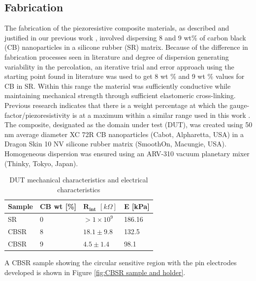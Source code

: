 \subsection{Fabrication} \label{sec:Fabrication}
The fabrication of the piezoresistive composite materials, as described and justified in our previous work \citep{Ellingham2021}, involved dispersing 8 and 9 wt\% of carbon black (CB) nanoparticles in a silicone rubber (SR) matrix. Because of the difference in fabrication processes seen in literature \cite{D'Asaro2017, Shang2016} and degree of dispersion generating variability in the percolation, an iterative trial and error approach using the starting point found in literature was used to get 8 wt \% and 9 wt \% values for CB in SR. Within this range the material was sufficiently conductive while maintaining mechanical strength through sufficient elastomeric cross-linking. Previous research indicates that there is a weight percentage at which the gauge-factor/piezoresistivity is at a maximum within a similar range used in this work \cite{Dong2017, Yang2020}. The composite, designated as the domain under test (DUT), was created using 50 nm average diameter XC 72R CB nanoparticles (Cabot, Alpharetta, USA) in a Dragon Skin 10 NV silicone rubber matrix (SmoothOn, Macungie, USA). Homogeneous dispersion was ensured using an ARV-310 vacuum planetary mixer (Thinky, Tokyo, Japan).
\begin{table}[H]
\caption{DUT mechanical characteristics and electrical characteristics}
\label{table:DUT_char}
\begin{center}
\begin{tabular}{llll}
\hline
\textbf{Sample}            & \textbf{CB wt} {[}\%{]}    & $\mathbf{R_{int}}$ $[k\Omega]$ & \textbf{E} {[}kPa{]}\\ \hline%
SR        & 0        &         $>1\times10^9$        &       186.16\\
CBSR        & 8        &         $18.1\pm9.8$          &       132.5\\
CBSR        & 9        &         $4.5\pm1.4$           &       98.1\\
\hline
\end{tabular}
\end{center}
\end{table}
A CBSR sample showing the circular sensitive region with the pin electrodes developed is shown in Figure \ref{fig:CBSR sample and holder}.
